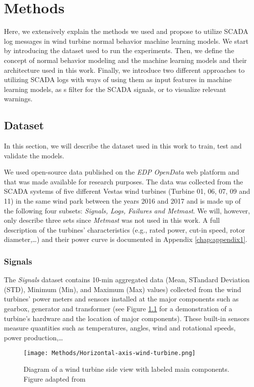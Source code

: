 \chapter{Methods}
\label{chap:methods}
Here, we extensively explain the methods we used and propose to utilize SCADA log messages in wind turbine normal behavior machine learning models.
We start by introducing the dataset used to run the experiments.
Then, we define the concept of normal behavior modeling and the machine learning models and their architecture used in this work.
Finally, we introduce two different approaches to utilizing SCADA logs with ways of using them as input features in machine learning models, as s filter for the SCADA signals,
or to visualize relevant warnings.

\section{Dataset}
In this section, we will describe the dataset used in this work to train, test and validate the models. 
\par We used open-source data published on the \emph{EDP OpenData} web platform \cite{EDP} and that was made available for research purposes. 
The data was collected from the SCADA systems of five different Vestas wind turbines (Turbine 01, 06, 07, 09 and 11) in the same wind park between the years 2016 and 2017 
and is made up of the following four subsets: \emph{Signals, Logs, Failures and Metmast}. We will, however, only describe three sets since \emph{Metmast} was not used in this work.
A full description of the turbines' characteristics (e.g., rated power, cut-in speed, rotor diameter,\dots) and their power curve is documented in Appendix \ref{chap:appendix1}.

\subsection{Signals}
 The \emph{Signals} dataset contains 10-min aggregated data (Mean, STandard Deviation (STD), Minimum (Min), and Maximum (Max) values) collected from the wind turbines' power meters and
 sensors installed at the major components such as gearbox, generator and transformer (see Figure \ref{fig:WTG_Diagram} for a 
 demonstration of a turbine's hardware and the location of major components). These built-in sensors measure quantities such as temperatures, angles, wind and rotational speeds, 
 power production,\dots

 \begin{figure}[H]
  \begin{center}
    \texttt{[image: Methods/Horizontal-axis-wind-turbine.png]}
  \end{center}
  \caption{Diagram of a wind turbine side view with labeled main components. Figure adapted from \cite{WTG_Diagram}}
  \label{fig:WTG_Diagram}
\end{figure}

